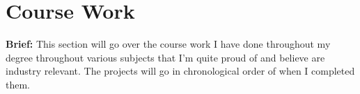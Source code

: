 \newpage
\section{Course Work}
\label{sec:course_work}

\textbf{Brief: } This section will go over the course work I have done throughout my degree throughout various subjects that I'm quite proud of and believe are industry relevant. The projects will go in chronological
order of when I completed them.



